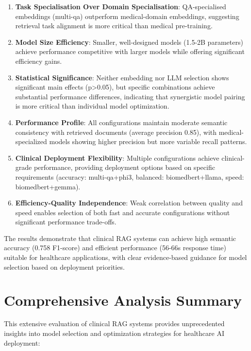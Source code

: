 \begin{enumerate}
    \item \textbf{Task Specialisation Over Domain Specialisation}: QA-specialised embeddings (multi-qa) outperform medical-domain embeddings, suggesting retrieval task alignment is more critical than medical pre-training.

    \item \textbf{Model Size Efficiency}: Smaller, well-designed models (1.5-2B parameters) achieve performance competitive with larger models while offering significant efficiency gains.

    \item \textbf{Statistical Significance}: Neither embedding nor LLM selection shows significant main effects (p>0.05), but specific combinations achieve substantial performance differences, indicating that synergistic model pairing is more critical than individual model optimization.

    \item \textbf{Performance Profile}: All configurations maintain moderate semantic consistency with retrieved documents (average precision 0.85), with medical-specialized models showing higher precision but more variable recall patterns.

    \item \textbf{Clinical Deployment Flexibility}: Multiple configurations achieve clinical-grade performance, providing deployment options based on specific requirements (accuracy: multi-qa+phi3, balanced: biomedbert+llama, speed: biomedbert+gemma).

    \item \textbf{Efficiency-Quality Independence}: Weak correlation between quality and speed enables selection of both fast and accurate configurations without significant performance trade-offs.
\end{enumerate}

The results demonstrate that clinical RAG systems can achieve high semantic accuracy (0.758 F1-score) and efficient performance (56-66s response time) suitable for healthcare applications, with clear evidence-based guidance for model selection based on deployment priorities.

\section{Comprehensive Analysis Summary}

This extensive evaluation of clinical RAG systems provides unprecedented insights into model selection and optimization strategies for healthcare AI deployment:

